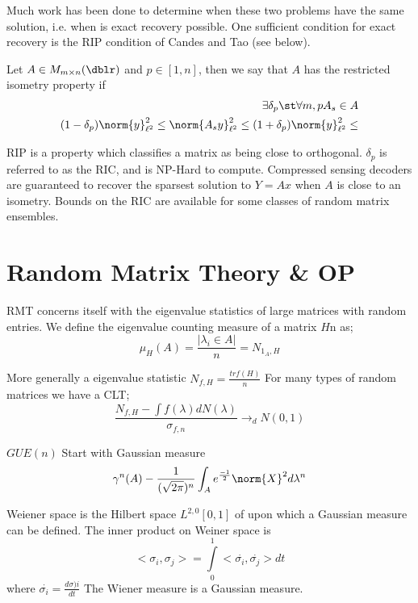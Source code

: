Much work has been done to determine when these two problems have the same solution, i.e. when is exact recovery possible. One  sufficient condition for exact recovery is the RIP condition of Candes and Tao (see below).

\begin{defn}
Let $A \in M_{m \times n}(\dblr)$ and $p \in [1,n]$, then we say that $A$ has the restricted isometry property if
\begin{eqnarray*}
  \exists \delta_p \st \forall m,p A_s \in A \\
  (1 - \delta_p) \norm{y}_{\ell^2}^2 \leq   \norm{A_s y}_{\ell^2}^2 \leq (1 + \delta_p) \norm{y}_{\ell^2}^2 \leq
\end{eqnarray*}
\end{defn}
RIP is a property which classifies a matrix as being close to orthogonal.  $\delta_p$ is referred to as the RIC, and is NP-Hard to compute.  Compressed sensing decoders are guaranteed to recover the sparsest solution to $Y = A x$ when $A$ is close to an isometry. Bounds on the RIC are available for some classes of random matrix ensembles.


\section*{Random Matrix Theory \& OP}

RMT concerns itself with the eigenvalue statistics of large matrices with random entries. We define the eigenvalue counting measure of a matrix $H$n as;
\begin{equation*}
\mu_H (A) = \frac{| \lambda_i \in A |}{n} = N_{1_A, H}
\end{equation*}

More generally a eigenvalue statistic $N_{f,H}  = \frac{tr f(H)}{n}$
For many types of random matrices we have a CLT;
\begin{equation*}
\frac{N_{f,H}-\int f(\lambda) dN(\lambda)}{\sigma_{f,n}} \rightarrow_d N(0,1)
\end{equation*}

$GUE(n)$ Start with Gaussian measure
\begin{equation*}
\gamma^n(A) - \frac{1}{(\sqrt{2 \pi} )^n} \int_A e^ \frac{-1}{2} \norm{X}^2 d \lambda^n
\end{equation*}

Weiener space is the Hilbert space $L^{2,0}[0,1]$ of upon which a Gaussian measure can be defined. The inner product on Weiner space is
\begin{equation*}
<\sigma_i,\sigma_j> = \int\limits_{0}^{1} <\overset{\cdot}{\sigma_i},\overset{\cdot}{\sigma_j}> dt
\end{equation*}
where $\overset{\cdot}{\sigma_i} = \frac{d \sigma)i}{dt}$
The Wiener measure is a Gaussian measure.

